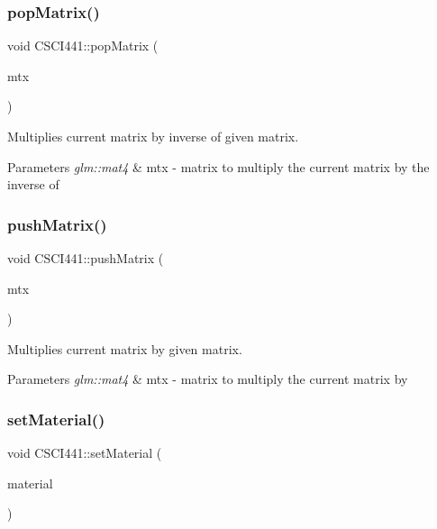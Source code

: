 \subsubsection{\texorpdfstring{pop\+Matrix()}{popMatrix()}}
{\footnotesize\ttfamily void C\+S\+C\+I441\+::pop\+Matrix (\begin{DoxyParamCaption}\item[{glm\+::mat4}]{mtx }\end{DoxyParamCaption})\hspace{0.3cm}{\ttfamily [inline]}}



Multiplies current matrix by inverse of given matrix. 


\begin{DoxyParams}{Parameters}
{\em glm\+::mat4} & mtx -\/ matrix to multiply the current matrix by the inverse of \\
\hline
\end{DoxyParams}
\mbox{\label{namespace_c_s_c_i441_aa818e8189c42c50e88d6d0512274bcfb}} 
\subsubsection{\texorpdfstring{push\+Matrix()}{pushMatrix()}}
{\footnotesize\ttfamily void C\+S\+C\+I441\+::push\+Matrix (\begin{DoxyParamCaption}\item[{glm\+::mat4}]{mtx }\end{DoxyParamCaption})\hspace{0.3cm}{\ttfamily [inline]}}



Multiplies current matrix by given matrix. 


\begin{DoxyParams}{Parameters}
{\em glm\+::mat4} & mtx -\/ matrix to multiply the current matrix by \\
\hline
\end{DoxyParams}
\mbox{\label{namespace_c_s_c_i441_ac201d649430f0c55e57db10b0dddd100}} 
\subsubsection{\texorpdfstring{set\+Material()}{setMaterial()}}
{\footnotesize\ttfamily void C\+S\+C\+I441\+::set\+Material (\begin{DoxyParamCaption}\item[{Material\+Struct}]{material }\end{DoxyParamCaption})\hspace{0.3cm}{\ttfamily [inline]}}



